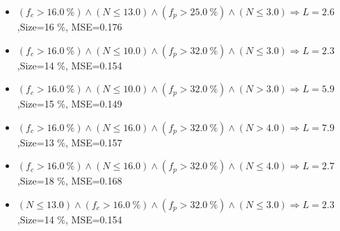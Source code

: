 \documentclass[numbered]{CSL}
\begin{document}
\begin{itemize}
\item $(f_c > 16.0~\%) \land (N \leq 13.0) \land (f_p > 25.0~\%) \land (N \leq 3.0) \Rightarrow L = 2.6$,\hfill Size=16 \%, MSE=0.176
\item $(f_c > 16.0~\%) \land (N \leq 10.0) \land (f_p > 32.0~\%) \land (N \leq 3.0) \Rightarrow L = 2.3$,\hfill Size=14 \%, MSE=0.154
\item $(f_c > 16.0~\%) \land (N \leq 10.0) \land (f_p > 32.0~\%) \land (N > 3.0) \Rightarrow L = 5.9$,\hfill Size=15 \%, MSE=0.149
\item $(f_c > 16.0~\%) \land (N \leq 16.0) \land (f_p > 32.0~\%) \land (N > 4.0) \Rightarrow L = 7.9$,\hfill Size=13 \%, MSE=0.157
\item $(f_c > 16.0~\%) \land (N \leq 16.0) \land (f_p > 32.0~\%) \land (N \leq 4.0) \Rightarrow L = 2.7$,\hfill Size=18 \%, MSE=0.168
\item $(N \leq 13.0) \land (f_c > 16.0~\%) \land (f_p > 32.0~\%) \land (N \leq 3.0) \Rightarrow L = 2.3$,\hfill Size=14 \%, MSE=0.154
\end{itemize}
\end{document}
